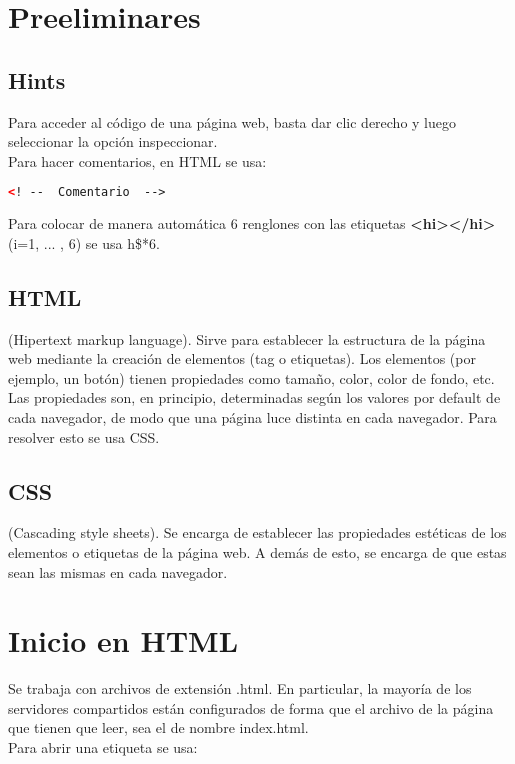 \documentclass[10pt,oneside]{article}
\begin{document}
\begin{multicols}{2} \tableofcontents

\section{Preeliminares}
\subsection{Hints}

    Para acceder al código de una página web, basta dar clic derecho y luego seleccionar la opción inspeccionar.\\ \newline Para hacer comentarios, en HTML se usa:   
    \begin{lstlisting}[language=HTML]
<! --  Comentario  -->        
    \end{lstlisting}

    Para colocar de manera automática 6 renglones con las etiquetas \textbf{<hi></hi>} (i=1, ... , 6) se usa h\$*6.

\subsection{HTML}

    (Hipertext markup language). Sirve para establecer la estructura de la página web mediante la creación de elementos (tag o etiquetas). Los elementos (por ejemplo, un botón) tienen propiedades como tamaño, color, color de fondo, etc. Las propiedades son, en principio, determinadas según los valores por default de cada navegador, de modo que una página luce distinta en cada navegador. Para resolver esto se usa CSS.  

\subsection{CSS} 

    (Cascading style sheets). Se encarga de establecer las propiedades estéticas de los elementos o etiquetas de la página web. A demás de esto, se encarga de que estas sean las mismas en cada navegador.

\section{Inicio en HTML}

    Se trabaja con archivos de extensión .html. En particular, la mayoría de los servidores compartidos están configurados de forma que el archivo de la página que tienen que leer, sea el de nombre index.html.\\ \newline Para abrir una etiqueta se usa: 


\end{multicols}
\end{document}
